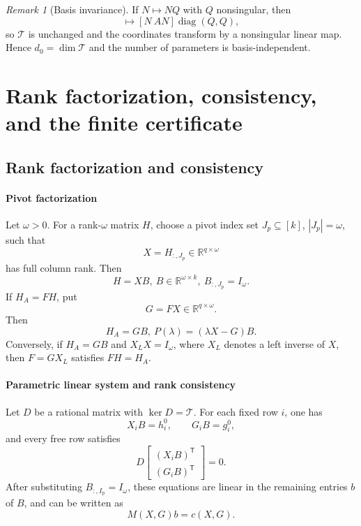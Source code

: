 \documentclass[journal]{IEEEtran}
\theoremstyle{plainn}
\theoremstyle{remark}
\newtheorem{remark}{Remark}
\begin{document}
\begin{remark}[Basis invariance]
	If $N\mapsto NQ$ with $Q$ nonsingular, then
	\begin{equation*}
	[N\ AN]\mapsto[N\ AN]\operatorname{diag}(Q,Q),
	\end{equation*}
	so $\mathcal T$ is unchanged and the coordinates transform by a nonsingular linear map. Hence $d_0=\dim\mathcal T$ and the number of parameters is basis-independent.
\end{remark}

\section{Rank factorization, consistency, and the finite certificate}\label{sec:certificate}
\subsection{Rank factorization and consistency}\label{sec:consistency}
\paragraph{Pivot factorization}\label{sec:pivot}
Let $\omega>0$. For a rank-$\omega$ matrix $H$, choose a pivot
index set $J_{p}\subseteq[k]$, $|J_{p}|=\omega$,
such that
\begin{equation*}
	X=H_{:,J_{p}}\in\mathbb R^{q\times\omega}
\end{equation*}
has full column rank. Then
\begin{equation}
	H=XB,\ B\in\mathbb R^{\omega\times k},\ 
	B_{:,J_p}=I_\omega.
\end{equation}
If $H_A=FH$, put
\begin{equation}
	G=FX\in\mathbb R^{q\times\omega}.
\end{equation}
Then
\begin{equation}
	H_A=GB,\ P(\lambda)=(\lambda X-G)B.
\end{equation}
Conversely, if $H_A=GB$ and $X_LX=I_\omega$, where $X_L$ denotes
a left inverse of $X$, then $F=GX_L$ satisfies $FH=H_A$.

\paragraph{Parametric linear system and rank consistency}\label{sec:param}

Let $D$ be a rational matrix with $\ker D=\mathcal T$. For each fixed
row $i$, one has
\begin{equation}
	X_iB=h_i^0,\qquad G_iB=g_i^0,
\end{equation}
and every free row satisfies
\begin{equation}
	D\begin{bmatrix}(X_iB)^{\mathsf T}\\ (G_iB)^{\mathsf T}\end{bmatrix}=0.
\end{equation}
After substituting $B_{:,I_{\mathrm p}}=I_\omega$, these equations are
linear in the remaining entries $b$ of $B$, and can be written as
\begin{equation}
	M(X,G)b=c(X,G).
\end{equation}
\end{document}
